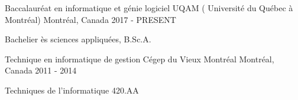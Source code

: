 \begin{cventries}
   \cventry
    {Baccalauréat en informatique et génie logiciel}
    {UQAM ( Université du Québec à Montréal)}
    {Montréal, Canada}
    {2017 - PRESENT}
    {
      \begin{cvitems}
         \item{Bachelier ès sciences appliquées, B.Sc.A.}
      \end{cvitems}
    }
    
    \cventry
    {Technique en informatique de gestion}
    {Cégep du Vieux Montréal}
    {Montréal, Canada}
    {2011 - 2014}
    {
      \begin{cvitems}
         \item{Techniques de l'informatique  420.AA}
      \end{cvitems}
    }
\end{cventries}
